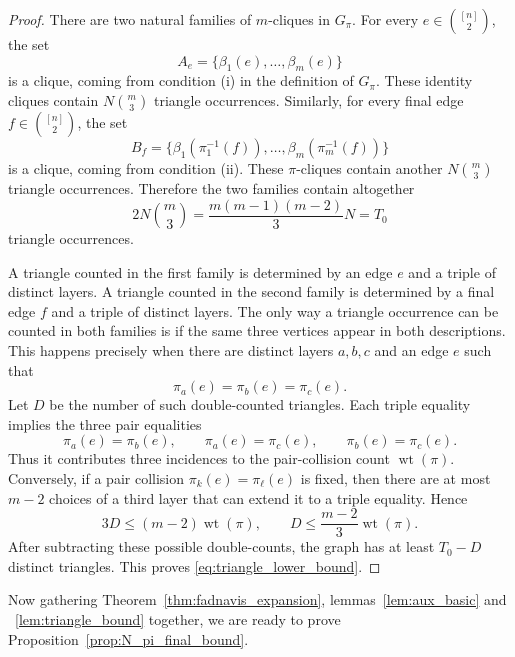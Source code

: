 \documentclass[10pt,a4paper]{amsart}
\renewcommand\leq{\leqslant}
\newcommand{\wt}{\operatorname{wt}}
\begin{document}
\begin{proof}
There are two natural families of $m$-cliques in $G_\pi$. For every $e\in\binom{[n]}2$, the set
\[
        A_e=\{\beta_1(e),\ldots,\beta_m(e)\}
\]
is a clique, coming from condition \textup{(i)} in the definition of $G_\pi$. These identity cliques contain $N\binom m3$ triangle occurrences. Similarly, for every final edge $f\in\binom{[n]}2$, the set
\[
        B_f=\{\beta_1(\pi_1^{-1}(f)),\ldots,
              \beta_m(\pi_m^{-1}(f))\}
\]
is a clique, coming from condition \textup{(ii)}. These $\pi$-cliques contain another $N\binom m3$ triangle occurrences. Therefore the two families contain altogether
\[
        2N\binom m3=\frac{m(m-1)(m-2)}3N=T_0
\]
triangle occurrences.

A triangle counted in the first family is determined by an edge $e$ and a triple of distinct layers. A triangle counted in the second family is determined by a final edge $f$ and a triple of distinct layers. The only way a triangle occurrence can be counted in both families is if the same three vertices appear in both descriptions. This happens precisely when there are distinct layers $a,b,c$ and an edge $e$ such that
\[
        \pi_a(e)=\pi_b(e)=\pi_c(e).
\]
Let $D$ be the number of such double-counted triangles. Each triple equality implies the three pair equalities
\[
        \pi_a(e)=\pi_b(e),\qquad
        \pi_a(e)=\pi_c(e),\qquad
        \pi_b(e)=\pi_c(e).
\]
Thus it contributes three incidences to the pair-collision count $\wt(\pi)$. Conversely, if a pair collision $\pi_k(e)=\pi_\ell(e)$ is fixed, then there are at most $m-2$ choices of a third layer that can extend it to a triple equality. Hence
\[
        3D\leq (m-2)\wt(\pi),
        \qquad
        D\leq \frac{m-2}{3}\wt(\pi).
\]
After subtracting these possible double-counts, the graph has at least $T_0-D$ distinct triangles. This proves \eqref{eq:triangle_lower_bound}.
\end{proof}


Now gathering Theorem~\ref{thm:fadnavis_expansion}, lemmas~\ref{lem:aux_basic} and ~\ref{lem:triangle_bound} together, we are ready to prove Proposition~\ref{prop:N_pi_final_bound}.
\end{document}
